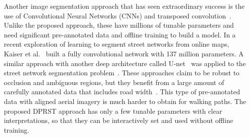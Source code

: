Another image segmentation approach that has seen extraordinary success is the use of Convolutional Neural Networks (CNNs) and transposed convolution~\cite{Badrinarayanan2017-il, Noh2015-ni, Shelhamer2017-rf, Ronneberger2015-sv}. 
Unlike the proposed approach, these have millions of tunable parameters and need significant pre-annotated data and offline training to build a model. 
In a recent exploration of learning to segment street networks from online maps, Kaiser et al.~\cite{Kaiser2017-np} built a fully convolutional network with 137 million parameters.
A similar approach with another deep architecture called U-net~\cite{Ronneberger2015-sv} was applied to the street network segmentation problem~\cite{Zhang2017-gi}.
These approaches claim to be robust to occlusion and ambiguous regions, but they benefit from a large amount of carefully annotated data that includes road width~\cite{Mnih2013-dp}. 
This type of pre-annotated data with aligned aerial imagery is much harder to obtain for walking paths. 
The proposed \ac{DPRST} approach has only a few tunable parameters with clear interpretations, so that they can be interactively set and used without offline training.


